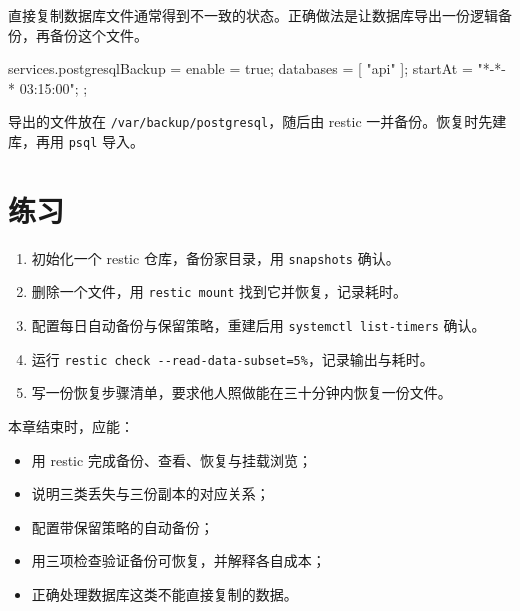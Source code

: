 直接复制数据库文件通常得到不一致的状态。正确做法是让数据库导出一份逻辑备份，再备份这个文件。

\begin{nixcode}
services.postgresqlBackup = {
  enable = true;
  databases = [ "api" ];
  startAt = "*-*-* 03:15:00";
};
\end{nixcode}

导出的文件放在 \texttt{/var/backup/\allowbreak{}postgresql}，随后由 restic 一并备份。恢复时先建库，再用 \texttt{psql} 导入。

\section{练习}

\begin{enumerate}
  \item 初始化一个 restic 仓库，备份家目录，用 \texttt{snapshots} 确认。
  \item 删除一个文件，用 \texttt{restic mount} 找到它并恢复，记录耗时。
  \item 配置每日自动备份与保留策略，重建后用 \texttt{systemctl list-timers} 确认。
  \item 运行 \texttt{restic check\allowbreak\ -{}-read-data-subset=5\%}，记录输出与耗时。
  \item 写一份恢复步骤清单，要求他人照做能在三十分钟内恢复一份文件。
\end{enumerate}

\begin{checkpoint}
本章结束时，应能：
\begin{itemize}
  \item 用 restic 完成备份、查看、恢复与挂载浏览；
  \item 说明三类丢失与三份副本的对应关系；
  \item 配置带保留策略的自动备份；
  \item 用三项检查验证备份可恢复，并解释各自成本；
  \item 正确处理数据库这类不能直接复制的数据。
\end{itemize}
\end{checkpoint}
